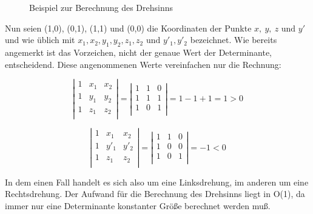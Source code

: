 \documentclass[ngerman]{scrreprt}%
\theoremstyle{break}
\begin{document}
\begin{figure}[H]
\centering

\caption{Beispiel zur Berechnung des Drehsinns}
\label{drehsinnskizze}
\end{figure}

Nun seien (1,0), (0,1), (1,1) und (0,0) die Koordinaten der Punkte $x,\ y,\ z \mbox{ und }y'$ 
und wie üblich mit $x_1, x_2, y_1, y_2, z_1, z_2 \mbox{ und } y'_1, y'_2$
bezeichnet. Wie bereits angemerkt ist das Vorzeichen, nicht der genaue Wert der
Determinante, entscheidend. Diese angenommen\-en Werte vereinfachen nur die Rechnung:

\[ \left| 
\begin{array}{ccc}
1 & x_1 & x_2\\
1 & y_1 & y_2\\
1 & z_1 & z_2\\
\end{array} 
\right|=
\left| 
\begin{array}{ccc}
1 & 1 & 0\\
1 & 1 & 1\\
1 & 0 & 1\\
\end{array} 
\right|=1-1+1=1>0 \]

\[ \left| 
\begin{array}{ccc}
1 & x_1 & x_2\\
1 & y'_1 & y'_2\\
1 & z_1 & z_2\\
\end{array} 
\right|=
\left| 
\begin{array}{ccc}
1 & 1 & 0\\
1 & 0 & 0\\
1 & 0 & 1\\
\end{array} 
\right|=-1<0 \]

In dem einen Fall handelt es sich also um eine Linksdrehung, im anderen um eine Rechtsdrehung. Der Aufwand für die Berechnung des
Drehsinns liegt in O(1), da immer nur eine Determinante konstanter Größe berechnet werden muß.
\end{document}
